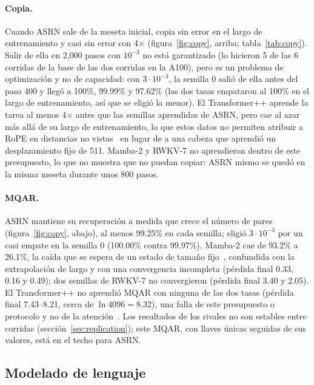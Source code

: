 \documentclass[11pt]{article}
\begin{document}
\paragraph{Copia.} Cuando ASRN sale de la meseta inicial, copia sin error en el largo de entrenamiento y casi sin error
con 4$\times$ (figura~\ref{fig:copy}, arriba; tabla~\ref{tab:copy}). Salir de ella en 2{,}000 pasos con $10^{-3}$ no
está garantizado (lo hicieron 5 de las 6 corridas de la base de las dos corridas en la A100), pero es un problema de
optimización y no de capacidad: con $3\cdot10^{-3}$, la semilla 0 salió de ella antes del paso 400 y llegó a 100\%,
99.99\% y 97.62\% (las dos tasas empataron al 100\% en el largo de entrenamiento, así que se eligió la menor). El
Transformer++ aprende la tarea al menos 4$\times$ antes que las semillas aprendidas de ASRN, pero cae al azar más allá
de su largo de entrenamiento, lo que estos datos no permiten atribuir a RoPE en distancias no
vistas~\cite{press2022alibi} en lugar de a una cabeza que aprendió un desplazamiento fijo de 511. Mamba-2 y RWKV-7 no
aprendieron dentro de este presupuesto, lo que no muestra que no puedan copiar: ASRN mismo se quedó en la misma meseta
durante unos 800 pasos.

\paragraph{MQAR.} ASRN mantiene su recuperación a medida que crece el número de pares (figura~\ref{fig:copy}, abajo),
al menos 99.25\% en cada semilla; eligió $3\cdot10^{-3}$ por un casi empate en la semilla 0 (100.00\% contra 99.97\%).
Mamba-2 cae de 93.2\% a 26.1\%, la caída que se espera de un estado de tamaño fijo~\cite{arora2023zoology}, confundida
con la extrapolación de largo y con una convergencia incompleta (pérdida final 0.33, 0.16 y 0.49); dos semillas de
RWKV-7 no convergieron (pérdida final 3.40 y 2.05). El Transformer++ no aprendió MQAR con ninguna de las dos tasas
(pérdida final 7.43--8.21, cerca de $\ln 4096=8.32$), una falla de este presupuesto o protocolo y no de la
atención~\cite{arora2023zoology}. Los resultados de los rivales no son estables entre corridas
(sección~\ref{sec:replication}); este MQAR, con llaves únicas seguidas de sus valores, está en el techo para ASRN.

\subsection{Modelado de lenguaje}
\label{sec:lm}
\end{document}
